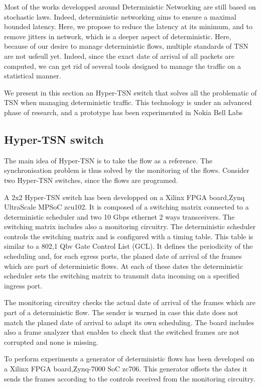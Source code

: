 Most of the works developped around Deterministic Networking are still based on stochastic laws. Indeed, deterministic networking aims to ensure a maximal bounded latency. Here, we propose to reduce the latency at its minimum, and to remove jitters in network, which is a deeper aspect of deterministic.
Here, because of our desire to manage deterministic flows, multiple standards of TSN are not usfeull yet. Indeed, since the exact date of arrival of all packets are computed, we can get rid of several tools designed to manage the traffic on a statistical manner. 

We present in this section an Hyper-TSN switch that solves all the problematic of TSN when managing deterministic traffic.
This technology is under an advanced phase of research, and a prototype has been experimented in Nokia Bell Labs


\subsection{Hyper-TSN switch}


The main idea of Hyper-TSN is to take the flow as a reference. The synchronisation problem is thus solved by the monitoring of the flows. Consider two Hyper-TSN switches, since the flows are programed.  

A 2x2 Hyper-TSN switch has been developped on a Xilinx FPGA board,Zynq UltraScale MPSoC zcu102. It is composed of a switching matrix connected to a deterministic scheduler and two 10 Gbps ethernet 2 ways transceivers. The switching matrix includes also a monitoring circuitry. The deterministic scheduler controls the switching matrix and is configured with a timing table. This table is similar to a 802,1 Qbv Gate Control List (GCL). It defines the periodicity of the scheduling and, for each egress ports, the planed date of arrival of the frames which are part of deterministic flows. At each of these dates the deterministic scheduler sets the switching matrix to transmit data incoming on a specified ingress port.

The monitoring circuitry checks the actual date of arrival of the frames which are part of a deterministic flow. The sender is warned in case this date does not match the planed date of arrival to adapt its own scheduling. The board includes also a frame analyzer that enables to check that the switched frames are not corrupted and none is missing.

To perform experiments a generator of deterministic flows has been developed on a Xilinx FPGA board,Zynq-7000 SoC zc706. This generator offsets the dates it sends the frames according to the controls received from the monitoring circuitry.

